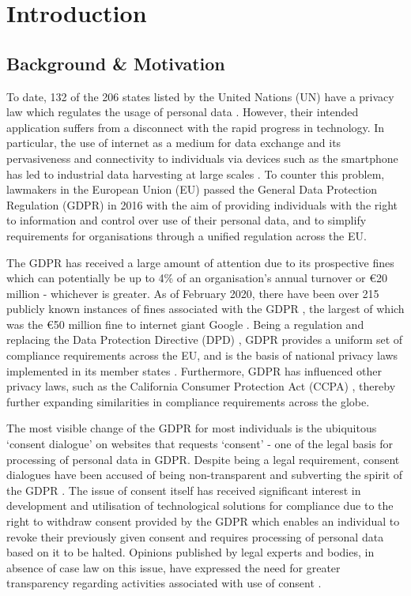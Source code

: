 \chapter{Introduction}
\label{chapter:introduction}

\section{Background \& Motivation}\label{sec:intro:background}
To date, 132 of the 206 states listed by the United Nations (UN) have a privacy law which regulates the usage of personal data \cite{greenleaf_global_2019-1}.
However, their intended application suffers from a disconnect with the rapid progress in technology. In particular, the use of internet as a medium for data exchange and its pervasiveness and connectivity to individuals via devices such as the smartphone has led to industrial data harvesting at large scales \cite{christl_networks_2016}. 
To counter this problem, lawmakers in the European Union (EU) passed the General Data Protection Regulation (GDPR) \cite{Regulation_GDPR} in 2016 with the aim of providing individuals with the right to information and control over use of their personal data, and to simplify requirements for organisations through a unified regulation across the EU.

The GDPR has received a large amount of attention due to its prospective fines which can potentially be up to 4\% of an organisation's annual turnover or €20 million - whichever is greater. 
As of February 2020, there have been over 215 publicly known instances of fines associated with the GDPR \cite{GDPR_fines_tracker}, the largest of which was the €50 million fine to internet giant Google \cite{CNIL_GOOGLE_2019}.
Being a regulation and replacing the Data Protection Directive (DPD) \cite{directive_DPD}, GDPR provides a uniform set of compliance requirements across the EU, and is the basis of national privacy laws implemented in its member states \cite{mccullagh_national_2019}.
Furthermore, GDPR has influenced other privacy laws, such as the California Consumer Protection Act (CCPA) \cite{CCPA}, thereby further expanding similarities in compliance requirements across the globe.

The most visible change of the GDPR for most individuals is the ubiquitous `consent dialogue' on websites that requests `consent' - one of the legal basis for processing of personal data in GDPR.
Despite being a legal requirement, consent dialogues have been accused of being non-transparent and subverting the spirit of the GDPR \cite{machuletz_multiple_2019,utz_informed_2019}.
The issue of consent itself has received significant interest in development and utilisation of technological solutions for compliance due to the right to withdraw consent provided by the GDPR which enables an individual to revoke their previously given consent and requires processing of personal data based on it to be halted.
Opinions published by legal experts and bodies, in absence of case law on this issue, have expressed the need for greater transparency regarding activities associated with use of consent \cite{opinion_AG_2019}.

